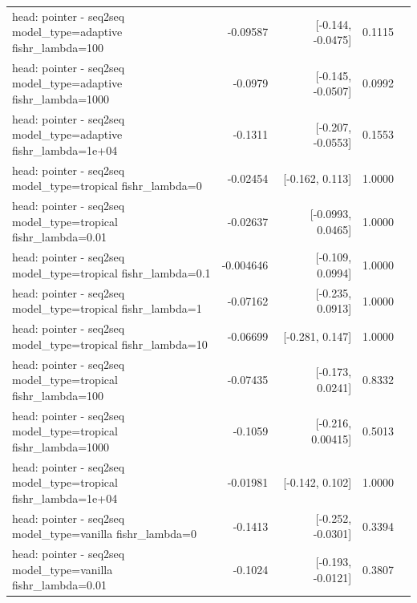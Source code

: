 \documentclass[10pt]{article}
\makeatletter
\newcommand{\stackcell}[1]{\begin{tabular}[t]{@{}l@{}}#1\end{tabular}}
\makeatother
\begin{document}
{\begin{longtable}{lrrrl}
\stackcell{head: pointer - seq2seq\\\footnotesize model\_type=adaptive fishr\_lambda=100 } & -0.09587 & [-0.144, -0.0475] & 0.1115 & \\
\stackcell{head: pointer - seq2seq\\\footnotesize model\_type=adaptive fishr\_lambda=1000 } & -0.0979 & [-0.145, -0.0507] & 0.0992 & \\
\stackcell{head: pointer - seq2seq\\\footnotesize model\_type=adaptive fishr\_lambda=1e+04 } & -0.1311 & [-0.207, -0.0553] & 0.1553 & \\
\stackcell{head: pointer - seq2seq\\\footnotesize model\_type=tropical fishr\_lambda=0 } & -0.02454 & [-0.162, 0.113] & 1.0000 & \\
\stackcell{head: pointer - seq2seq\\\footnotesize model\_type=tropical fishr\_lambda=0.01 } & -0.02637 & [-0.0993, 0.0465] & 1.0000 & \\
\stackcell{head: pointer - seq2seq\\\footnotesize model\_type=tropical fishr\_lambda=0.1 } & -0.004646 & [-0.109, 0.0994] & 1.0000 & \\
\stackcell{head: pointer - seq2seq\\\footnotesize model\_type=tropical fishr\_lambda=1 } & -0.07162 & [-0.235, 0.0913] & 1.0000 & \\
\stackcell{head: pointer - seq2seq\\\footnotesize model\_type=tropical fishr\_lambda=10 } & -0.06699 & [-0.281, 0.147] & 1.0000 & \\
\stackcell{head: pointer - seq2seq\\\footnotesize model\_type=tropical fishr\_lambda=100 } & -0.07435 & [-0.173, 0.0241] & 0.8332 & \\
\stackcell{head: pointer - seq2seq\\\footnotesize model\_type=tropical fishr\_lambda=1000 } & -0.1059 & [-0.216, 0.00415] & 0.5013 & \\
\stackcell{head: pointer - seq2seq\\\footnotesize model\_type=tropical fishr\_lambda=1e+04 } & -0.01981 & [-0.142, 0.102] & 1.0000 & \\
\stackcell{head: pointer - seq2seq\\\footnotesize model\_type=vanilla fishr\_lambda=0 } & -0.1413 & [-0.252, -0.0301] & 0.3394 & \\
\stackcell{head: pointer - seq2seq\\\footnotesize model\_type=vanilla fishr\_lambda=0.01 } & -0.1024 & [-0.193, -0.0121] & 0.3807 & \\

\end{longtable}}
\end{document}
